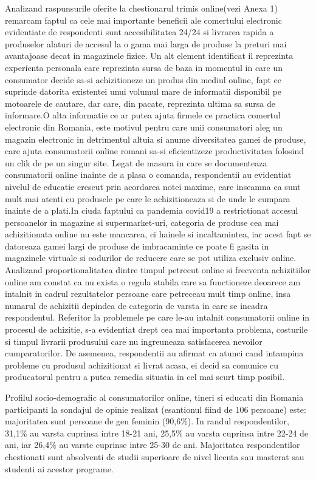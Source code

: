 \documentclass[a4paper, 12pt]{article}
\begin{document}
	\quad Analizand raspunsurile oferite la chestionarul trimis online(vezi Anexa 1) remarcam faptul ca cele mai importante beneficii ale comertului electronic evidentiate de respondenti sunt accesibilitatea 24/24 si livrarea rapida a produselor alaturi de accesul la o gama mai larga de produse la preturi mai avantajoase decat in magazinele fizice. Un alt element identificat il reprezinta experienta personala care reprezinta sursa de baza in momentul in care un consumator decide sa-si achizitioneze un produs din mediul online, fapt ce suprinde datorita existentei unui volumul mare de informatii disponibil pe motoarele de cautare, dar care, din pacate, reprezinta ultima sa sursa de informare.O alta informatie ce ar putea ajuta firmele ce practica comertul electronic din Romania, este motivul pentru care unii consumatori aleg un magazin electronic in detrimentul altuia si anume diversitatea gamei de produse, care ajuta consumatorii online romani sa-si eficientizeze productivitatea folosind un clik de pe un singur site. Legat de masura in care se documenteaza consumatorii online inainte de a plasa o comanda, respondentii au evidentiat nivelul de educatie crescut prin acordarea notei maxime, care inseamna ca sunt mult mai atenti cu produsele pe care le achizitioneaza si de unde le cumpara inainte de a plati.In ciuda faptului ca pandemia covid19 a restrictionat accesul persoanelor in magazine si supermarket-uri, categoria de produse cea mai achizitionata online nu este mancarea, ci hainele si incaltamintea, iar acest fapt se datoreaza gamei largi de produse de imbracaminte ce poate fi gasita in magazinele virtuale si codurilor de reducere care se pot utiliza exclusiv online. Analizand proportionalitatea dintre timpul petrecut online si frecventa achizitiilor online am constat ca nu exista o regula stabila care sa functioneze deoarece am intalnit in cadrul rezultatelor persoane care petreceau mult timp online, insa numarul de achizitii depindea de categoria de varsta in care se incadra respondentul. Referitor la problemele pe care le-au intalnit consumatorii online in procesul de achizitie, s-a evidentiat drept cea mai importanta problema, costurile si timpul livrarii produsului care nu ingreuneaza satisfacerea nevoilor cumparatorilor. De asemenea, respondentii au afirmat ca atunci cand intampina probleme cu produsul achizitionat si livrat acasa, ei decid sa comunice cu producatorul pentru a putea remedia situatia in cel mai scurt timp posibil.
	
	\quad Profilul socio-demografic al consumatorilor online, tineri si educati din Romania participanti la sondajul de opinie realizat (esantionul fiind de 106 persoane) este: majoritatea sunt persoane de gen feminin (90,6\%). In randul respondentilor, 31,1\% au varsta cuprinsa intre 18-21 ani, 25,5\% au varsta cuprinsa intre 22-24 de ani, iar 26,4\% au varste cuprinse intre 25-30 de ani. Majoritatea respondentilor chestionati sunt absolventi de studii superioare de nivel licenta sau masterat sau studenti ai acestor programe. 
	
\end{document}
